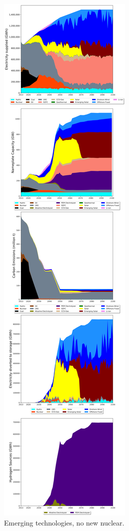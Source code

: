 \begin{figure}[h] 
\centering
\label{scen3}
\includegraphics[scale=0.15]{figures/newtechs_nonuc}
\caption{Emerging technologies, no new nuclear.}
\end{figure}

